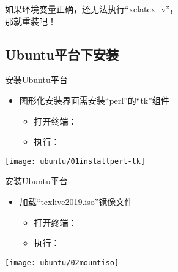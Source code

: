 \documentclass[fontset = none, t]{ctexbeamer}
\begin{document}
\begin{frame}
  如果环境变量正确，还无法执行\enquote{xelatex -v}，\\那就重装\tl 吧！
\end{frame}

\subsection[Ubuntu平台]{Ubuntu平台下安装\tl}
\begin{frame}{安装\tl}{Ubuntu平台}
  \begin{spacing}{1.0}
    \begin{itemize}
    \item 图形化安装界面需安装\enquote{perl}的\enquote{tk}组件
      \begin{itemize}
      \item 打开终端：\setmenukeyswin {}\\
      \item 执行：
      \end{itemize}
    \end{itemize}
  \begin{center}
    \texttt{[image: ubuntu/01installperl-tk]}
  \end{center}
  \end{spacing}
\end{frame}

\begin{frame}{安装\tl}{Ubuntu平台}
  \begin{spacing}{1.0}
    \begin{itemize}
    \item 加载\enquote{texlive2019.iso}镜像文件
      \begin{itemize}
      \item 打开终端：\setmenukeyswin {}\\
      \item 执行：
      \end{itemize}
    \end{itemize}
  \begin{center}
    \texttt{[image: ubuntu/02mountiso]}
  \end{center}
  \end{spacing}
\end{frame}
\end{document}
